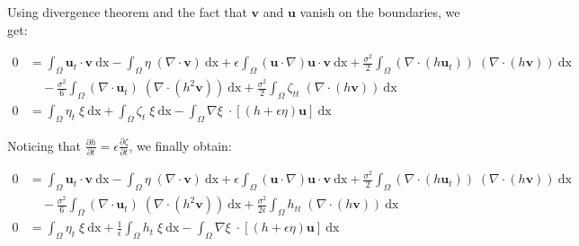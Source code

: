 \documentclass[compress,t]{beamer}
\begin{document}
			\begin{frame}
				Using divergence theorem and the fact that $\mathbf{v}$ and $\mathbf{u}$ vanish on the boundaries, we get: 
				\begin{scriptsize}
					\begin{equation*}
						\begin{split}
							0 &= \int_{\Omega} \! \mathbf{u}_t \cdot \mathbf{v} \: \mathrm{dx} - \int_{\Omega} \! \eta \; (\nabla \cdot \mathbf{v}) \: \mathrm{dx} + \epsilon \! \int_{\Omega} \! (\mathbf{u} \cdot \nabla ) \mathbf{u} \cdot \mathbf{v} \: \mathrm{dx} + \frac{\sigma^2}{2} \! \int_{\Omega} \!  (\nabla \cdot (h \mathbf{u}_t)) \; (\nabla \cdot (h \mathbf{v}) )\: \mathrm{dx} \\
							&\quad - \frac{\sigma^2}{6} \! \int_{\Omega} \! (\nabla \cdot \mathbf{u}_t) \; (\nabla  \cdot (h^2  \mathbf{v})) \: \mathrm{dx} + \frac{\sigma^2}{2} \! \int_{\Omega} \!  \zeta_{tt}  \; (\nabla \cdot( h \mathbf{v})) \: \mathrm{dx}\\
							0 &= \int_{\Omega}\! \eta_t \; \xi \: \mathrm{dx} +\int_{\Omega}\! \zeta_t \; \xi \: \mathrm{dx} -\int_{\Omega}\! \nabla \xi \; \cdot [(h+\epsilon\eta) \mathbf{u}]  \: \mathrm{dx}
						\end{split} 
					\end{equation*}
				\end{scriptsize}
				Noticing that $\frac{\partial h}{\partial t} = \epsilon \frac{\partial \zeta}{\partial t}$, we finally obtain: 
				\begin{scriptsize}
					\begin{equation*}
						\begin{split}
							0 &= \int_{\Omega} \! \mathbf{u}_t \cdot \mathbf{v} \: \mathrm{dx} - \int_{\Omega} \! \eta \; (\nabla \cdot \mathbf{v}) \: \mathrm{dx} + \epsilon \! \int_{\Omega} \! (\mathbf{u} \cdot \nabla ) \mathbf{u} \cdot \mathbf{v} \: \mathrm{dx} + \frac{\sigma^2}{2} \! \int_{\Omega} \!  (\nabla \cdot (h 
\mathbf{u}_t)) \; (\nabla \cdot (h \mathbf{v}) )\: \mathrm{dx} \\ 
							&\quad - \frac{\sigma^2}{6} \! \int_{\Omega} \! (\nabla \cdot \mathbf{u}_t) \; (\nabla  \cdot (h^2  \mathbf{v})) \: \mathrm{dx} + \frac{\sigma^2}{2 \epsilon} \! \int_{\Omega} \!  h_{tt}  \; (\nabla \cdot( h \mathbf{v})) \: \mathrm{dx}\\
							0 &= \int_{\Omega}\! \eta_t \; \xi \: \mathrm{dx} +\frac{1}{\epsilon}\int_{\Omega}\! h_t \; \xi \: \mathrm{dx} -\int_{\Omega}\! \nabla \xi \; \cdot [(h+\epsilon\eta) \mathbf{u}]  \: \mathrm{dx}
						\end{split}
					\end{equation*}
				\end{scriptsize}
			\end{frame}
			
\end{document}

